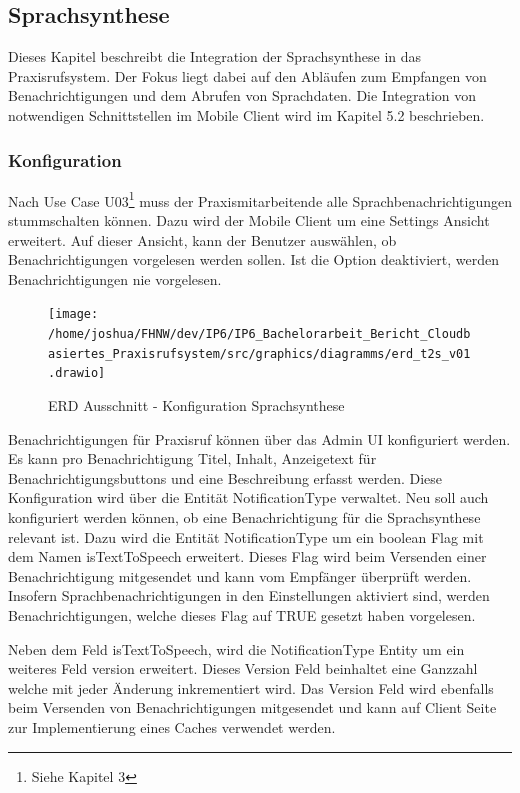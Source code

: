 \subsection{Sprachsynthese}

Dieses Kapitel beschreibt die Integration der Sprachsynthese in das Praxisrufsystem.
Der Fokus liegt dabei auf den Abläufen zum Empfangen von Benachrichtigungen und dem Abrufen von Sprachdaten.
Die Integration von notwendigen Schnittstellen im Mobile Client wird im Kapitel 5.2 beschrieben.

\subsubsection{Konfiguration}

Nach Use Case U03\footnote{Siehe Kapitel 3} muss der Praxismitarbeitende alle Sprachbenachrichtigungen stummschalten können.
Dazu wird der Mobile Client um eine Settings Ansicht erweitert.
Auf dieser Ansicht, kann der Benutzer auswählen, ob Benachrichtigungen vorgelesen werden sollen.
Ist die Option deaktiviert, werden Benachrichtigungen nie vorgelesen.

\begin{figure}[h]
    \centering
    \begin{minipage}[b]{0.75\textwidth}
        \texttt{[image: /home/joshua/FHNW/dev/IP6/IP6\_Bachelorarbeit\_Bericht\_Cloudbasiertes\_Praxisrufsystem/src/graphics/diagramms/erd\_t2s\_v01.drawio]}
        \caption{ERD Ausschnitt - Konfiguration Sprachsynthese}
    \end{minipage}
\end{figure}

Benachrichtigungen für Praxisruf können über das Admin UI konfiguriert werden.
Es kann pro Benachrichtigung Titel, Inhalt, Anzeigetext für Benachrichtigungsbuttons und eine Beschreibung erfasst werden.
Diese Konfiguration wird über die Entität NotificationType verwaltet.
Neu soll auch konfiguriert werden können, ob eine Benachrichtigung für die Sprachsynthese relevant ist.
Dazu wird die Entität NotificationType um ein boolean Flag mit dem Namen isTextToSpeech erweitert.
Dieses Flag wird beim Versenden einer Benachrichtigung mitgesendet und kann vom Empfänger überprüft werden.
Insofern Sprachbenachrichtigungen in den Einstellungen aktiviert sind, werden Benachrichtigungen, welche dieses Flag auf TRUE gesetzt haben vorgelesen.

Neben dem Feld isTextToSpeech, wird die NotificationType Entity um ein weiteres Feld version erweitert.
Dieses Version Feld beinhaltet eine Ganzzahl welche mit jeder Änderung inkrementiert wird.
Das Version Feld wird ebenfalls beim Versenden von Benachrichtigungen mitgesendet und kann auf Client Seite zur Implementierung eines Caches verwendet werden.


